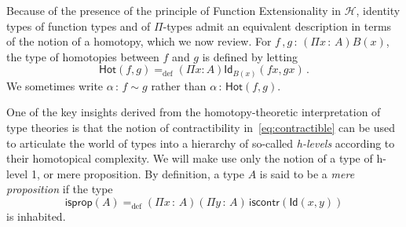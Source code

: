 \documentclass[10pt,a4paper,oneside,reqno]{amsart}
\numberwithin{equation}{section}
\theoremstyle{mythm}
\theoremstyle{mydef}
\theoremstyle{myrmk}
\newcommand{\defeq}{=_{\mathrm{def}}}
\newcommand{\co}{\,{:}\,}
\newcommand{\Hint}{\mathcal{H}}
\newcommand{\iscontr}{\mathsf{iscontr}}
\newcommand{\isprop}{\mathsf{isprop}}
\newcommand{\Hot}{\mathsf{Hot}}
\newcommand{\Id}{\mathsf{Id}}
\begin{document}
Because of the presence of the principle of Function Extensionality in $\Hint$, 
identity types of function types and of $\Pi$-types admit an equivalent description in terms of the notion of
a homotopy, which we now review.  For $f \, , g \co (\Pi x \co A) B(x)$, the type of homotopies between $f$ and $g$ 
is defined by letting
\[
\Hot(f,g) \defeq (\Pi x:A) \Id_{B(x)}(fx,gx) \, .
\]
We sometimes write  $\alpha \co f \sim g$ rather than $\alpha \co \Hot(f,g)$. 

One of the key insights derived from the homotopy-theoretic interpretation of type theories is that
the notion of contractibility in~\eqref{eq:contractible}  can be used to articulate the world of types  
into a hierarchy of so-called \emph{h-levels} according to their homotopical complexity. We will make use only the notion of a type of h-level 1, or mere proposition. By definition, a type $A$ is said to be a \emph{mere proposition} if the type
\[
\isprop(A) \defeq (\Pi x \co A)(\Pi  y \co A) \, \iscontr( \Id(x,y)) 
\]
is inhabited.
\end{document}
